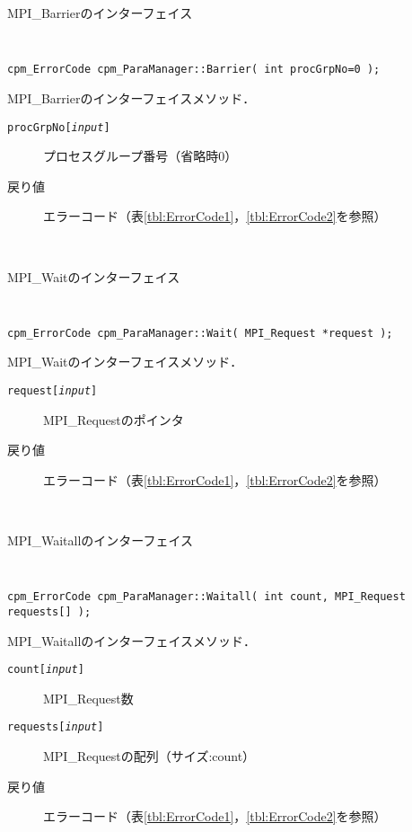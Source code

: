 \begin{spacing}{0.8}
\begin{itembox}[l]{MPI\_Barrierのインターフェイス}
{\tt
\begin{verbatim}
cpm_ErrorCode cpm_ParaManager::Barrier( int procGrpNo=0 );
\end{verbatim}
}
MPI\_Barrierのインターフェイスメソッド．
\begin{description}
\item[{\tt procGrpNo[{\it input}]}] プロセスグループ番号（省略時0）
\\
\item[戻り値] エラーコード（表\ref{tbl:ErrorCode1}，\ref{tbl:ErrorCode2}を参照）
\end{description}
\end{itembox}\\
\end{spacing}

\begin{spacing}{0.8}
\begin{itembox}[l]{MPI\_Waitのインターフェイス}
{\tt
\begin{verbatim}
cpm_ErrorCode cpm_ParaManager::Wait( MPI_Request *request );
\end{verbatim}
}
MPI\_Waitのインターフェイスメソッド．
\begin{description}
\item[{\tt request[{\it input}]}] MPI\_Requestのポインタ
\\
\item[戻り値] エラーコード（表\ref{tbl:ErrorCode1}，\ref{tbl:ErrorCode2}を参照）
\end{description}
\end{itembox}\\
\end{spacing}

\begin{spacing}{0.8}
\begin{itembox}[l]{MPI\_Waitallのインターフェイス}
{\tt
\begin{verbatim}
cpm_ErrorCode cpm_ParaManager::Waitall( int count, MPI_Request requests[] );
\end{verbatim}
}
MPI\_Waitallのインターフェイスメソッド．
\begin{description}
\item[{\tt count[{\it input}]}] MPI\_Request数
\item[{\tt requests[{\it input}]}] MPI\_Requestの配列（サイズ:count）
\\
\item[戻り値] エラーコード（表\ref{tbl:ErrorCode1}，\ref{tbl:ErrorCode2}を参照）
\end{description}
\end{itembox}\\
\end{spacing}

